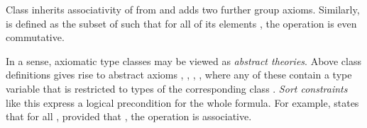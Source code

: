 \begin{isabellebody}
\begin{isamarkuptext}
\noindent Class  inherits associativity of \isa{{\isasymodot}}
 from  and adds two further group axioms. Similarly,
  is defined as the subset of  such that
 for all of its elements \isa{{\isasymtau}}, the operation \isa{{\isasymodot}\ {\isasymColon}\ {\isasymtau}\ {\isasymRightarrow}\ {\isasymtau}\ {\isasymRightarrow}\ {\isasymtau}} is even commutative.%
\end{isamarkuptext}%
\isamarkuptrue%
%
\isamarkuptrue%
%
\begin{isamarkuptext}%
In a sense, axiomatic type classes may be viewed as \emph{abstract
 theories}.  Above class definitions gives rise to abstract axioms
 , , , , where any of these contain a type variable 
 that is restricted to types of the corresponding class .
 \emph{Sort constraints} like this express a logical precondition for
 the whole formula.  For example,  states that for all
 \isa{{\isasymtau}}, provided that , the operation
 \isa{{\isasymodot}\ {\isasymColon}\ {\isasymtau}\ {\isasymRightarrow}\ {\isasymtau}\ {\isasymRightarrow}\ {\isasymtau}} is associative.


\end{isamarkuptext}
\end{isabellebody}
